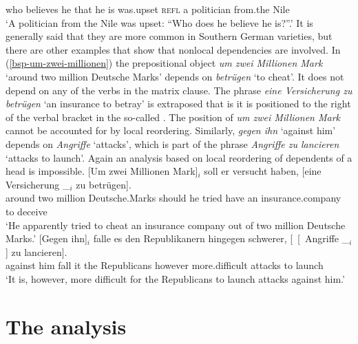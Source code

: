     \hphantom{"`}who believes he that he {} is was.upset \textsc{refl} a politician from.the Nile\\
\glt `A politician from the Nile was upset: ``Who does he believe he is?''.'
\zl
It is generally said that they are more common in Southern German varieties, but there are other
examples that show that nonlocal dependencies are involved. In (\ref{bsp-um-zwei-millionen}) the
prepositional object \emph{um zwei Millionen Mark} `around two million Deutsche Marks' depends on
\emph{betrügen} `to cheat'. It does not
depend on any of the verbs in the matrix clause. The phrase \emph{eine Versicherung zu betrügen} `an
insurance to betray' is extraposed that is it is positioned to the right of the verbal bracket in the so-called \nf. The
position of \emph{um zwei Millionen Mark} cannot be accounted for by local reordering. Similarly,
\emph{gegen ihn} `against him' depends on \emph{Angriffe} `attacks', which is part of the phrase \emph{Angriffe zu
  lancieren} `attacks to launch'. Again an analysis based on local reordering of dependents of a head is impossible.
\eal
\label{bsp-Fernabhaengigkeit}
\ex\label{bsp-um-zwei-millionen}
\gll {}[Um zwei Millionen Mark]$_i$ soll er versucht haben, [eine Versicherung \_$_i$ zu betrügen].\footnotemark\\
       \spacebr{}around two million Deutsche.Marks should he tried have \spacebr{}an insurance.company {} to deceive\\\german
{}
\glt `He apparently tried to cheat an insurance company out of two million Deutsche Marks.'
\ex
\gll {}[Gegen ihn]$_i$ falle es den Republikanern hingegen schwerer, [~[~Angriffe \_$_i$] zu lancieren].\footnotemark\\
	 {}\spacebr{}against him fall it the Republicans however more.difficult \hphantom{[~[~}attacks {} to launch\\
\glt `It is, however, more difficult for the Republicans to launch attacks against him.'
\zl



\section{The analysis}
\label{sec-analysis-verb-mevement}


